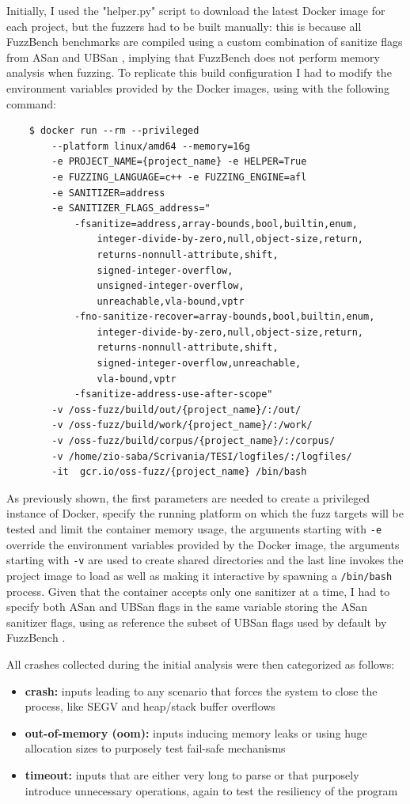 Initially, I used the "helper.py" script to download the latest Docker image for each project, but the fuzzers had to be built manually:
this is because all FuzzBench benchmarks are compiled using a custom combination of sanitize flags from ASan and UBSan \cite{flags}, implying that FuzzBench does not perform memory analysis when fuzzing. To replicate this build configuration I had to modify the environment variables provided by the Docker images, using with the following command:
\begin{verbatim}
    $ docker run --rm --privileged 
        --platform linux/amd64 --memory=16g 
        -e PROJECT_NAME={project_name} -e HELPER=True 
        -e FUZZING_LANGUAGE=c++ -e FUZZING_ENGINE=afl 
        -e SANITIZER=address 
        -e SANITIZER_FLAGS_address="
            -fsanitize=address,array-bounds,bool,builtin,enum,
                integer-divide-by-zero,null,object-size,return,
                returns-nonnull-attribute,shift,
                signed-integer-overflow,
                unsigned-integer-overflow,
                unreachable,vla-bound,vptr
            -fno-sanitize-recover=array-bounds,bool,builtin,enum,
                integer-divide-by-zero,null,object-size,return,
                returns-nonnull-attribute,shift,
                signed-integer-overflow,unreachable,
                vla-bound,vptr 
            -fsanitize-address-use-after-scope" 
        -v /oss-fuzz/build/out/{project_name}/:/out/  
        -v /oss-fuzz/build/work/{project_name}/:/work/
        -v /oss-fuzz/build/corpus/{project_name}/:/corpus/
        -v /home/zio-saba/Scrivania/TESI/logfiles/:/logfiles/  
        -it  gcr.io/oss-fuzz/{project_name} /bin/bash
\end{verbatim}
As previously shown, the first parameters are needed to create a privileged instance of Docker, specify the running platform on which the fuzz targets will be tested and limit the container memory usage, the arguments starting with \verb|-e| override the environment variables provided by the Docker image, the arguments starting with \verb|-v| are used to create shared directories and the last line invokes the project image to load as well as making it interactive by spawning a \verb|/bin/bash| process.
Given that the container accepts only one sanitizer at a time, I had to specify both ASan and UBSan flags in the same variable storing the ASan sanitizer flags, using as reference the subset of UBSan flags used by default by FuzzBench \cite{flags}.

\newpage
All crashes collected during the initial analysis were then categorized as follows:
\begin{itemize}
    \item \textbf{crash:} inputs leading to any scenario that forces the system to close the process, like SEGV and heap/stack buffer overflows
    \item \textbf{out-of-memory (oom):} inputs inducing memory leaks or using huge allocation sizes to purposely test fail-safe mechanisms
    \item \textbf{timeout:} inputs that are either very long to parse or that purposely introduce unnecessary operations, again to test the resiliency of the program 
\end{itemize}

